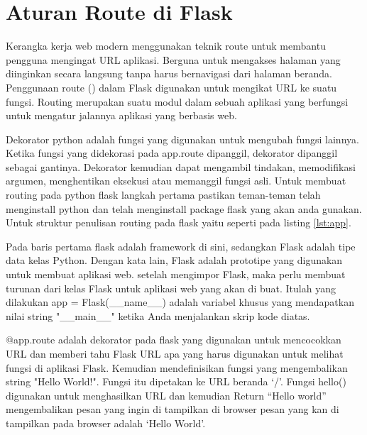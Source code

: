 \section{Aturan Route di Flask}	
Kerangka kerja web modern menggunakan teknik route untuk membantu pengguna mengingat URL aplikasi. Berguna untuk mengakses halaman yang diinginkan secara langsung tanpa harus bernavigasi dari halaman beranda. Penggunaan route () dalam Flask digunakan untuk mengikat URL ke suatu fungsi. Routing merupakan suatu modul dalam sebuah aplikasi yang berfungsi untuk mengatur jalannya aplikasi yang berbasis web.

Dekorator python adalah fungsi yang digunakan untuk mengubah fungsi lainnya. Ketika fungsi yang didekorasi pada app.route dipanggil, dekorator dipanggil sebagai gantinya. Dekorator kemudian dapat mengambil tindakan, memodifikasi argumen, menghentikan eksekusi atau memanggil fungsi asli. Untuk membuat routing pada python flask langkah pertama pastikan teman-teman telah menginstall python dan telah menginstall package flask yang akan anda gunakan. Untuk struktur penulisan routing pada flask yaitu seperti pada listing \ref{lst:app}.


Pada baris pertama flask adalah framework di sini, sedangkan Flask adalah tipe data kelas Python. Dengan kata lain, Flask adalah prototipe yang digunakan untuk membuat aplikasi web. setelah mengimpor Flask, maka perlu membuat turunan dari kelas Flask untuk aplikasi web yang akan di buat. Itulah yang dilakukan  app = Flask(\_\_name\_\_)  adalah variabel khusus yang mendapatkan nilai string "\_\_main\_\_" ketika Anda menjalankan skrip kode diatas.

@app.route adalah dekorator pada flask yang digunakan untuk mencocokkan URL dan  memberi tahu Flask URL apa yang harus digunakan untuk melihat fungsi di aplikasi Flask. Kemudian mendefinisikan fungsi yang mengembalikan string "Hello World!". Fungsi itu dipetakan ke URL beranda ‘/’. Fungsi hello() digunakan untuk menghasilkan URL dan kemudian Return “Hello world” mengembalikan pesan yang ingin di tampilkan di browser pesan yang kan di tampilkan pada browser adalah ‘Hello World’.

